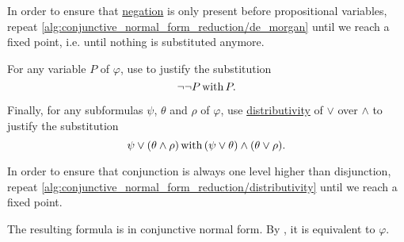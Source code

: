 \begin{algorithm}
\begin{thmenum}
    In order to ensure that \hyperref[def:propositional_language/negation]{negation} is only present before propositional variables, repeat \ref{alg:conjunctive_normal_form_reduction/de_morgan} until we reach a fixed point, i.e. until nothing is substituted anymore.

     For any variable \( P \) of \( \varphi \), use  to justify the substitution
    \begin{equation*}
      \neg \neg P \T{with} P.
    \end{equation*}

     Finally, for any subformulas \( \psi \), \( \theta \) and \( \rho \) of \( \varphi \), use \hyperref[eq:def:semilattice/distributive_lattice/finite/join_over_meet]{distributivity} of \( \vee \) over \( \wedge \) to justify the substitution
    \begin{equation*}
      \psi \vee (\theta \wedge \rho) \T{with} (\psi \vee \theta) \wedge (\theta \vee \rho).
    \end{equation*}

    In order to ensure that conjunction is always one level higher than disjunction, repeat \ref{alg:conjunctive_normal_form_reduction/distributivity} until we reach a fixed point.
  \end{thmenum}

  The resulting formula is in conjunctive normal form. By , it is equivalent to \( \varphi \).
\end{algorithm}
